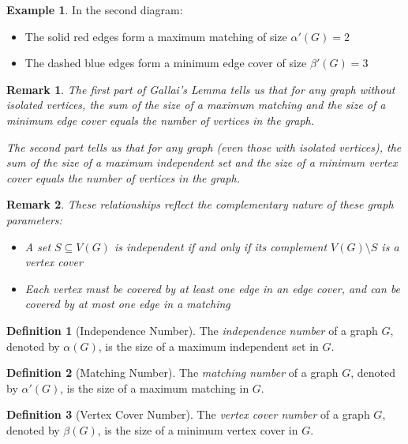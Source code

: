 \documentclass{article}
\newtheorem{remark}{Remark}
\theoremstyle{definition}
\newtheorem{example}{Example}
\newtheorem{definition}{Definition}
\begin{document}
\begin{example}
In the second diagram:
\begin{itemize}
\item The solid red edges form a maximum matching of size $\alpha'(G) = 2$
\item The dashed blue edges form a minimum edge cover of size $\beta'(G) = 3$
\end{itemize}
\end{example}

\begin{remark}
The first part of Gallai's Lemma tells us that for any graph without isolated vertices, the sum of the size of a maximum matching and the size of a minimum edge cover equals the number of vertices in the graph.

The second part tells us that for any graph (even those with isolated vertices), the sum of the size of a maximum independent set and the size of a minimum vertex cover equals the number of vertices in the graph.
\end{remark}

\begin{remark}
These relationships reflect the complementary nature of these graph parameters:
\begin{itemize}
\item A set $S \subseteq V(G)$ is independent if and only if its complement $V(G) \setminus S$ is a vertex cover
\item Each vertex must be covered by at least one edge in an edge cover, and can be covered by at most one edge in a matching
\end{itemize}
\end{remark}

\begin{definition}[Independence Number]
The \emph{independence number} of a graph $G$, denoted by $\alpha(G)$, is the size of a maximum independent set in $G$.
\end{definition}

\begin{definition}[Matching Number]
The \emph{matching number} of a graph $G$, denoted by $\alpha'(G)$, is the size of a maximum matching in $G$.
\end{definition}

\begin{definition}[Vertex Cover Number]
The \emph{vertex cover number} of a graph $G$, denoted by $\beta(G)$, is the size of a minimum vertex cover in $G$.
\end{definition}
\end{document}
